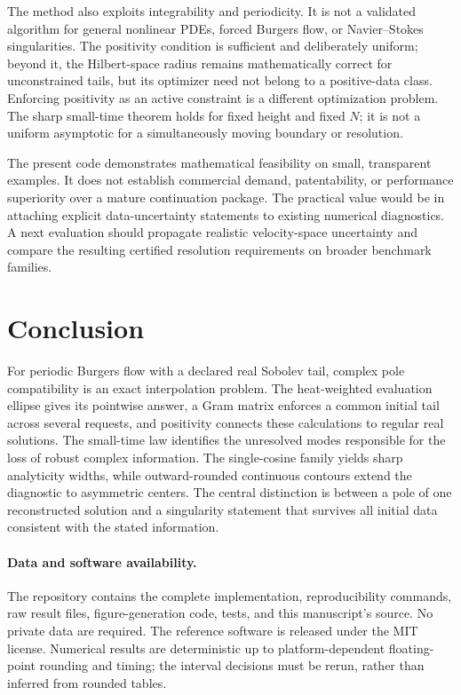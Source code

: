 \documentclass[11pt]{article}
\begin{document}
The method also exploits integrability and periodicity. It is not a validated algorithm for general nonlinear PDEs, forced Burgers flow, or Navier--Stokes singularities. The positivity condition is sufficient and deliberately uniform; beyond it, the Hilbert-space radius remains mathematically correct for unconstrained tails, but its optimizer need not belong to a positive-data class. Enforcing positivity as an active constraint is a different optimization problem. The sharp small-time theorem holds for fixed height and fixed $N$; it is not a uniform asymptotic for a simultaneously moving boundary or resolution.

The present code demonstrates mathematical feasibility on small, transparent examples. It does not establish commercial demand, patentability, or performance superiority over a mature continuation package. The practical value would be in attaching explicit data-uncertainty statements to existing numerical diagnostics. A next evaluation should propagate realistic velocity-space uncertainty and compare the resulting certified resolution requirements on broader benchmark families.

\section{Conclusion}
For periodic Burgers flow with a declared real Sobolev tail, complex pole compatibility is an exact interpolation problem. The heat-weighted evaluation ellipse gives its pointwise answer, a Gram matrix enforces a common initial tail across several requests, and positivity connects these calculations to regular real solutions. The small-time law identifies the unresolved modes responsible for the loss of robust complex information. The single-cosine family yields sharp analyticity widths, while outward-rounded continuous contours extend the diagnostic to asymmetric centers. The central distinction is between a pole of one reconstructed solution and a singularity statement that survives all initial data consistent with the stated information.

\paragraph{Data and software availability.}
The repository contains the complete implementation, reproducibility commands, raw result files, figure-generation code, tests, and this manuscript's source. No private data are required. The reference software is released under the MIT license. Numerical results are deterministic up to platform-dependent floating-point rounding and timing; the interval decisions must be rerun, rather than inferred from rounded tables.
\end{document}
